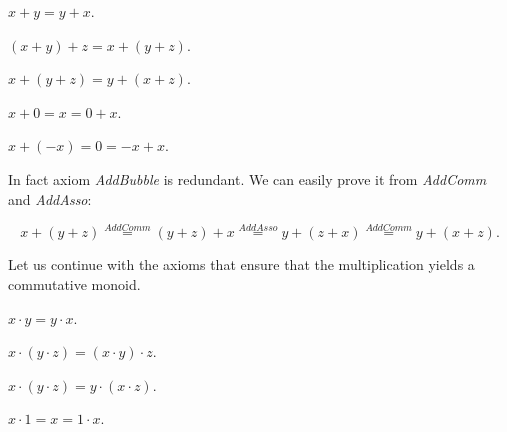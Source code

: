 \documentclass{article}
\begin{document}
  \begin{forthel}
    \begin{axiom}[AddComm]
      $x + y = y + x$.
    \end{axiom}

    \begin{axiom}[AddAsso]
      $(x + y) + z = x + (y + z)$.
    \end{axiom}

    \begin{axiom}[AddBubble]
      $x + (y + z) = y + (x + z)$.
    \end{axiom}

    \begin{axiom}[AddZero]
      $x + 0 = x = 0 + x$.
    \end{axiom}

    \begin{axiom}[AddInvr]
      $x + (-x) = 0 = -x + x$.
    \end{axiom}
  \end{forthel}

  In fact axiom \textit{AddBubble} is redundant. We can easily prove it from \textit{AddComm} and \textit{AddAsso}:

  \[
    x + (y + z) \overset{AddComm}{=} (y + z) + x \overset{AddAsso}{=} y + (z + x) \overset{AddComm}{=} y + (x + z).
  \]

  Let us continue with the axioms that ensure that the multiplication yields a commutative monoid.

  \begin{forthel}
    \begin{axiom}[MulComm]
      $x \cdot y = y \cdot x$.
    \end{axiom}

    \begin{axiom}[MulAsso]
      $x \cdot (y \cdot z) = (x \cdot y) \cdot z$.

    \end{axiom}

    \begin{axiom}[MulBubble]
      $x \cdot (y \cdot z) = y \cdot (x \cdot z)$.
    \end{axiom}

    \begin{axiom}[MulUnit]
      $x \cdot 1 = x = 1 \cdot x$.
    \end{axiom}
  \end{forthel}
\end{document}
